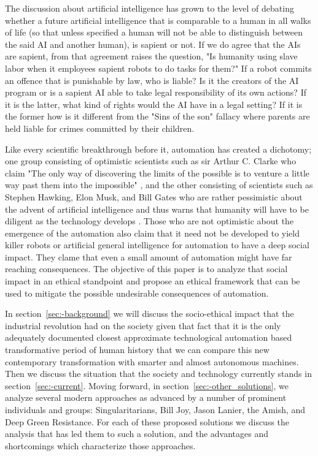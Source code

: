 The discussion about artificial intelligence has grown to the level of debating whether a future artificial intelligence that is comparable to a human in all walks of life (so that unless specified a human will not be able to distinguish between the said AI and another human\cite{eyal1999turing}), is sapient or not. If we do agree that the AIs are sapient, from that agreement raises the question, "Is humanity using slave labor when it employees sapient robots to do tasks for them?" If a robot commits an offence that is punishable by law, who is liable? Is it the creators of the AI program or is a sapient AI able to take legal responsibility of its own actions? If it is the latter, what kind of rights would the AI have in a legal setting? If it is the former how is it different from the "Sins of the son" fallacy where parents are held liable for crimes committed by their children.  

Like every scientific breakthrough before it, automation has created a dichotomy; one group consisting of optimistic scientists such as sir Arthur C. Clarke who claim "The only way of discovering the limits of the possible is to venture a little way past them into the impossible" \cite{arthur1962limits}, and the other consisting of scientists such as Stephen Hawking, Elon Musk, and Bill Gates who are rather pessimistic about the advent of artificial intelligence and thus warns that humanity will have to be diligent as the technology develops \cite{michael2016warning}. Those who are not optimistic about the emergence of the automation also claim that it need not be developed to yield killer robots or artificial general intelligence \cite{luke2013agi} for automation to have a deep social impact. They clame that even a small amount of automation might have far reaching consequences.  The objective of this paper is to analyze that social impact in an ethical standpoint and propose an ethical framework that can be used to mitigate the possible undesirable consequences of automation.  

In section~\ref{sec:-background} we will discuss the socio-ethical impact that the industrial revolution had on the society given that fact that it is the only adequately documented closest approximate technological automation based transformative period of human history that we can compare this new contemporary transformation with smarter and almost autonomous machines. Then we discuss the situation that the society and technology currently stands in section~\ref{sec:-current}. Moving forward, in section~\ref{sec:-other_solutions}, we analyze several modern approaches as advanced by a number of prominent individuals and groups: Singularitarians, Bill Joy, Jason Lanier, the Amish, and Deep Green Resistance. For each of these proposed solutions we discuss the analysis that has led them to such a solution, and the advantages and shortcomings which characterize those approaches.

